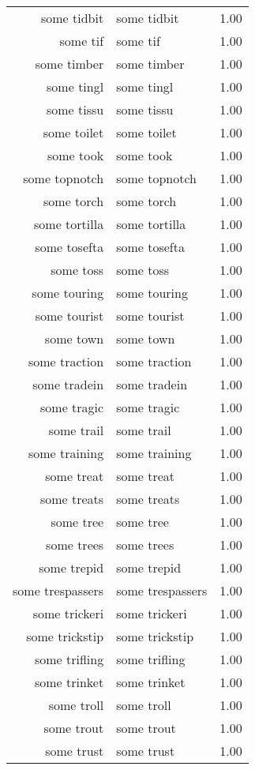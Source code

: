 \begin{table}[ht]
\begin{tabular}{rlr}
  some tidbit & some tidbit & 1.00 \\ 
  some tif & some tif & 1.00 \\ 
  some timber & some timber & 1.00 \\ 
  some tingl & some tingl & 1.00 \\ 
  some tissu & some tissu & 1.00 \\ 
  some toilet & some toilet & 1.00 \\ 
  some took & some took & 1.00 \\ 
  some topnotch & some topnotch & 1.00 \\ 
  some torch & some torch & 1.00 \\ 
  some tortilla & some tortilla & 1.00 \\ 
  some tosefta & some tosefta & 1.00 \\ 
  some toss & some toss & 1.00 \\ 
  some touring & some touring & 1.00 \\ 
  some tourist & some tourist & 1.00 \\ 
  some town & some town & 1.00 \\ 
  some traction & some traction & 1.00 \\ 
  some tradein & some tradein & 1.00 \\ 
  some tragic & some tragic & 1.00 \\ 
  some trail & some trail & 1.00 \\ 
  some training & some training & 1.00 \\ 
  some treat & some treat & 1.00 \\ 
  some treats & some treats & 1.00 \\ 
  some tree & some tree & 1.00 \\ 
  some trees & some trees & 1.00 \\ 
  some trepid & some trepid & 1.00 \\ 
  some trespassers & some trespassers & 1.00 \\ 
  some trickeri & some trickeri & 1.00 \\ 
  some trickstip & some trickstip & 1.00 \\ 
  some trifling & some trifling & 1.00 \\ 
  some trinket & some trinket & 1.00 \\ 
  some troll & some troll & 1.00 \\ 
  some trout & some trout & 1.00 \\ 
  some trust & some trust & 1.00 \\ 

\end{tabular}
\end{table}
